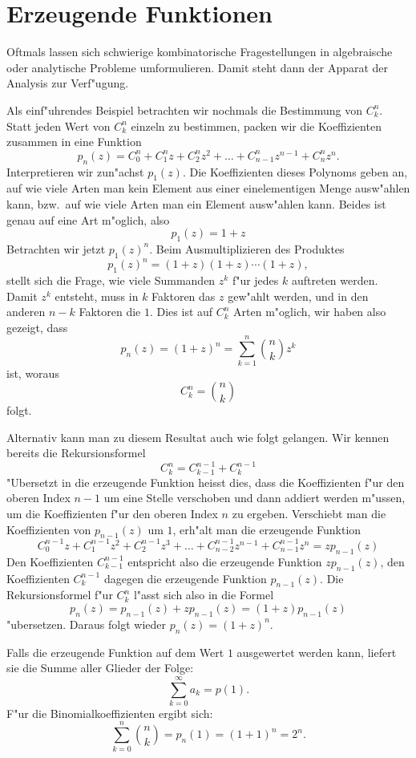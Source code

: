 \section{Erzeugende Funktionen}
Oftmals lassen sich schwierige kombinatorische Fragestellungen in
algebraische oder analytische Probleme umformulieren.
Damit steht
dann der Apparat der Analysis zur Verf"ugung.

Als einf"uhrendes
Beispiel betrachten wir nochmals die Bestimmung von $C^n_k$.
Statt jeden Wert von $C^n_k$ einzeln zu bestimmen, packen wir
die Koeffizienten zusammen in eine Funktion
\[
p_n(z)=C^n_0+C^n_1z +C^n_2z^2+\dots+C^n_{n-1}z^{n-1}+C^n_nz^n.
\]
Interpretieren wir zun"achst $p_1(z)$.
Die Koeffizienten dieses
Polynoms geben an, auf wie viele Arten man kein Element aus einer
einelementigen Menge ausw"ahlen kann, bzw.~auf wie viele Arten man 
ein Element ausw"ahlen kann.
Beides ist genau auf eine Art m"oglich,
also
\[
p_1(z)=1+z
\]
Betrachten wir jetzt $p_1(z)^n$.
Beim Ausmultiplizieren des
Produktes 
\[
p_1(z)^n= (1+z)(1+z)\dotsm(1+z),
\]
stellt sich die Frage, wie viele Summanden $z^k$ f"ur jedes
$k$ auftreten werden.
Damit $z^k$ entsteht, muss in $k$ Faktoren das $z$ gew"ahlt werden,
und in den anderen $n-k$ Faktoren die $1$.
Dies ist auf $C^n_k$
Arten m"oglich, wir haben also gezeigt, dass
\[
p_n(z)=(1+z)^n=\sum_{k=1}^n \binom{n}{k}z^k
\]
ist, woraus
\[
C^n_k=\binom{n}{k}
\]
folgt.

Alternativ kann man zu diesem Resultat auch wie folgt gelangen.
Wir kennen bereits die Rekursionsformel
\[
C^n_k=C^{n-1}_{k-1}+C^{n-1}_k
\]
"Ubersetzt in die erzeugende Funktion heisst dies, dass die Koeffizienten
f"ur den oberen Index $n-1$
um eine Stelle verschoben und dann addiert werden m"ussen,
um die Koeffizienten f"ur den oberen Index $n$ zu ergeben.
Verschiebt
man die Koeffizienten von $p_{n-1}(z)$ um $1$,
erh"alt man die erzeugende Funktion
\[
C^{n-1}_0z
+C^{n-1}_1z^2
+C^{n-1}_2z^3
+\dots
+C^{n-1}_{n-2}z^{n-1}
+C^{n-1}_{n-1}z^n
=zp_{n-1}(z)
\]
Den Koeffizienten $C^{n-1}_{k-1}$ entspricht also die
erzeugende Funktion $zp_{n-1}(z)$,
den Koeffizienten $C^{n-1}_k$ dagegen die erzeugende Funktion $p_{n-1}(z)$.
Die Rekursionsformel f"ur $C^n_k$ l"asst sich also in die Formel
\[
p_n(z)=p_{n-1}(z)+zp_{n-1}(z)=(1+z)p_{n-1}(z)
\]
"ubersetzen.
Daraus folgt wieder $p_n(z)=(1+z)^n$.

Falls die erzeugende Funktion auf dem Wert $1$ ausgewertet werden kann,
liefert sie die Summe aller Glieder der Folge:
\[
\sum_{k=0}^\infty a_k=p(1).
\]
F"ur die Binomialkoeffizienten ergibt sich:
\[
\sum_{k=0}^n\binom{n}{k}=p_n(1)=(1+1)^n=2^n.
\]


